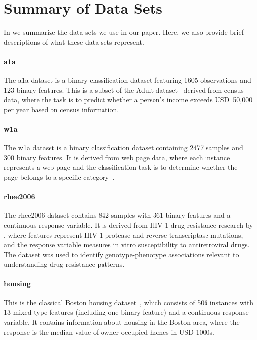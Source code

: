 \section{Summary of Data Sets}\label{sec:data-summary}

In  we summarize the data sets we use in our paper. Here, we also
provide brief descriptions of what these data sets represent.

\paragraph{a1a}

The a1a dataset is a binary classification dataset featuring 1605 observations and 123
binary features. This is a subset of the Adult dataset~\citep{becker1996,platt1998} derived
from census data, where the task is to predict whether a person's income exceeds USD~50,000
per year based on census information.

\paragraph{w1a}

The w1a dataset is a binary classification dataset containing 2477 samples and 300 binary
features. It is derived from web page data, where each instance represents a web page and
the classification task is to determine whether the page belongs to a specific
category~\citep{platt1998}.

\paragraph{rhee2006}

The rhee2006 dataset contains 842 samples with 361 binary features and a continuous
response variable. It is derived from HIV-1 drug resistance research by \citet{rhee2006} ,
where features represent HIV-1 protease and reverse transcriptase mutations, and the
response variable measures in vitro susceptibility to antiretroviral drugs. The dataset was
used to identify genotype-phenotype associations relevant to understanding drug resistance
patterns.

\paragraph{housing}

This is the classical Boston housing dataset~\citep{harrison1978}, which consists of 506
instances with 13 mixed-type features (including one binary feature) and a continuous
response variable. It contains information about housing in the Boston area, where the
response is the median value of owner-occupied homes in USD 1000s.


